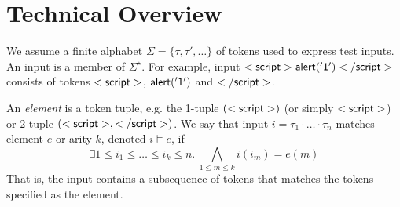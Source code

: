 \section{Technical Overview}

We assume a finite alphabet $\Sigma=\{ \tau,\tau',\ldots \}$ of tokens used to express test inputs. An input is a member of $\Sigma^{\star}$. For example, input ${\sf <script>alert('1')</script>}$ consists of tokens ${\sf <script>}$, ${\sf alert('1')}$ and ${\sf </script>}$.

An \emph{element} is a token tuple, e.g. the 1-tuple ${\sf (<script>)}$ (or simply ${\sf <script>}$) or 2-tuple ${\sf (<script>,</script>)}$. We say that input $i=\tau_1 \cdot \ldots \cdot \tau_n$ matches element $e$ or arity $k$, denoted $i \models e$, if
$$
\exists 1 \leq i_1 \leq \ldots \leq i_k \leq n.\ \bigwedge_{1 \leq m \leq k}
i(i_m) = e(m)  
$$
That is, the input contains a subsequence of tokens that matches the tokens specified as the element.